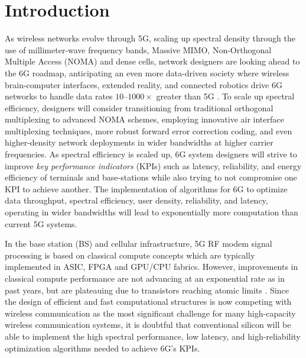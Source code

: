 
\chapter{Introduction} \label{Chapter:introduction}  %

\ifpdf
    \graphicspath{{Chapter1/Figs/Raster/}{Chapter1/Figs/PDF/}{Chapter1/Figs/}}
\else
    \graphicspath{{Chapter1/Figs/Vector/}{Chapter1/Figs/}}
\fi



As wireless networks evolve through 5G, scaling up spectral density through the use of millimeter-wave frequency bands, Massive MIMO, Non-Orthogonal Multiple Access (NOMA) and dense cells, network designers are looking ahead to the 6G roadmap, anticipating an even more data-driven society where wireless brain-computer interfaces, extended reality, and connected robotics drive 6G networks to handle data rates $10$–$1000\times$ greater than 5G \cite{243}. To scale up spectral efficiency, designers will consider transitioning from traditional orthogonal multiplexing to advanced NOMA schemes, employing innovative air interface multiplexing techniques, more robust forward error correction coding, and even higher-density network deployments in wider bandwidths at higher carrier frequencies. As spectral efficiency is scaled up, 6G system designers will strive to improve \textit{key performance indicators} (KPIs) such as latency, reliability, and energy efficiency of terminals and base-stations while also trying to not compromise one KPI to achieve another. The implementation of algorithms for 6G to optimize data throughput, spectral efficiency, user density, reliability, and latency, operating in wider bandwidths will lead to exponentially more computation than current 5G systems.

In the base station (BS) and cellular infrastructure, 5G RF modem signal processing is based on classical compute concepts which are typically implemented in ASIC, FPGA and GPU/CPU fabrics. However, improvements in classical compute performance are not advancing at an exponential rate as in past years, but are plateauing due to transistors reaching atomic limits \cite{ITRS2015}. Since the design of efficient and fast computational structures is now competing with wireless communication as the most significant challenge for many high-capacity wireless communication systems, it is doubtful that conventional silicon will be able to implement the high spectral performance, low latency, and high-reliability optimization algorithms needed to achieve 6G’s KPIs.

